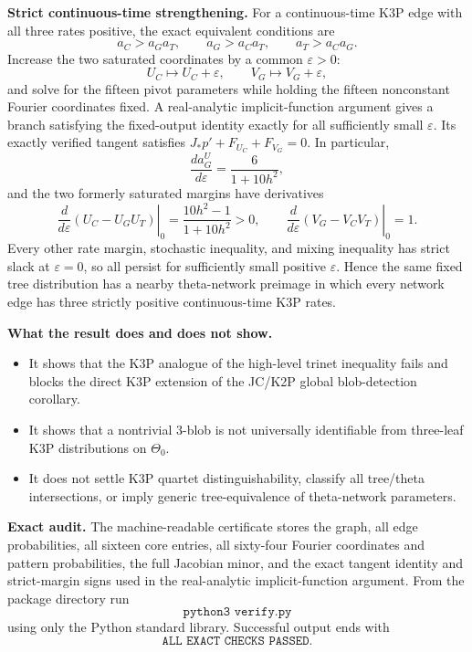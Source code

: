 \documentclass[10pt]{article}
\newcommand{\ThetaZero}{\Theta_0}
\begin{document}
\textbf{Strict continuous-time strengthening.}
For a continuous-time K3P edge with all three rates positive, the exact equivalent conditions are
\[
a_C>a_Ga_T,\qquad a_G>a_Ca_T,\qquad a_T>a_Ca_G.
\]
Increase the two saturated coordinates by a common $\varepsilon>0$:
\[
U_C\mapsto U_C+\varepsilon,\qquad V_G\mapsto V_G+\varepsilon,
\]
and solve for the fifteen pivot parameters while holding the fifteen nonconstant Fourier coordinates fixed.  A real-analytic implicit-function argument gives a branch satisfying the fixed-output identity exactly for all sufficiently small $\varepsilon$.  Its exactly verified tangent satisfies $J_*p'+F_{U_C}+F_{V_G}=0$.  In particular,
\[
\frac{d a_G^U}{d\varepsilon}=\frac6{1+10h^2},
\]
and the two formerly saturated margins have derivatives
\[
\left.\frac d{d\varepsilon}(U_C-U_GU_T)\right|_0
=\frac{10h^2-1}{1+10h^2}>0,
\qquad
\left.\frac d{d\varepsilon}(V_G-V_CV_T)\right|_0=1.
\]
Every other rate margin, stochastic inequality, and mixing inequality has strict slack at $\varepsilon=0$, so all persist for sufficiently small positive $\varepsilon$.  Hence the same fixed tree distribution has a nearby theta-network preimage in which every network edge has three strictly positive continuous-time K3P rates.

\textbf{What the result does and does not show.}
\begin{itemize}
\item It shows that the K3P analogue of the high-level trinet inequality fails and blocks the direct K3P extension of the JC/K2P global blob-detection corollary.
\item It shows that a nontrivial $3$-blob is not universally identifiable from three-leaf K3P distributions on $\ThetaZero$.
\item It does not settle K3P quartet distinguishability, classify all tree/theta intersections, or imply generic tree-equivalence of theta-network parameters.
\end{itemize}

\textbf{Exact audit.}
The machine-readable certificate stores the graph, all edge probabilities, all sixteen core entries, all sixty-four Fourier coordinates and pattern probabilities, the full Jacobian minor, and the exact tangent identity and strict-margin signs used in the real-analytic implicit-function argument.  From the package directory run
\[
\texttt{python3 verify.py}
\]
using only the Python standard library.  Successful output ends with
\[
\texttt{ALL EXACT CHECKS PASSED}.
\]
\end{document}
